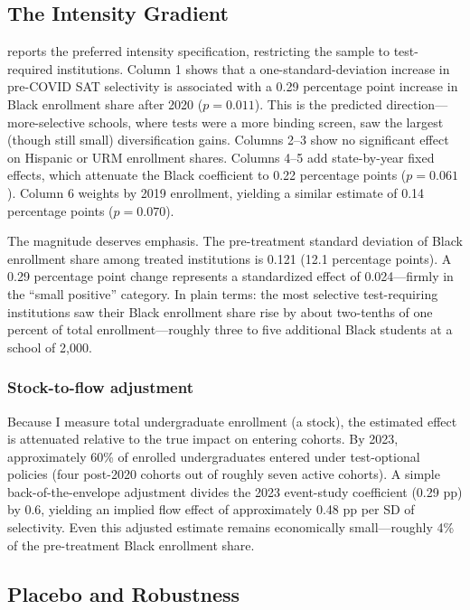 \documentclass[12pt]{article}
\begin{document}
\subsection{The Intensity Gradient}

 reports the preferred intensity specification, restricting the sample to test-required institutions. Column 1 shows that a one-standard-deviation increase in pre-COVID SAT selectivity is associated with a 0.29 percentage point increase in Black enrollment share after 2020 ($p = 0.011$). This is the predicted direction---more-selective schools, where tests were a more binding screen, saw the largest (though still small) diversification gains. Columns 2--3 show no significant effect on Hispanic or URM enrollment shares. Columns 4--5 add state-by-year fixed effects, which attenuate the Black coefficient to 0.22 percentage points ($p = 0.061$). Column 6 weights by 2019 enrollment, yielding a similar estimate of 0.14 percentage points ($p = 0.070$).

The magnitude deserves emphasis. The pre-treatment standard deviation of Black enrollment share among treated institutions is 0.121 (12.1 percentage points). A 0.29 percentage point change represents a standardized effect of 0.024---firmly in the ``small positive'' category. In plain terms: the most selective test-requiring institutions saw their Black enrollment share rise by about two-tenths of one percent of total enrollment---roughly three to five additional Black students at a school of 2,000.

\subsubsection*{Stock-to-flow adjustment} Because I measure total undergraduate enrollment (a stock), the estimated effect is attenuated relative to the true impact on entering cohorts. By 2023, approximately 60\% of enrolled undergraduates entered under test-optional policies (four post-2020 cohorts out of roughly seven active cohorts). A simple back-of-the-envelope adjustment divides the 2023 event-study coefficient (0.29 pp) by 0.6, yielding an implied flow effect of approximately 0.48 pp per SD of selectivity. Even this adjusted estimate remains economically small---roughly 4\% of the pre-treatment Black enrollment share.



\subsection{Placebo and Robustness}
\label{sec:placebo}
\end{document}
